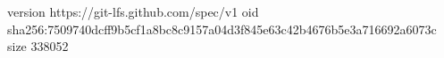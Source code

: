 version https://git-lfs.github.com/spec/v1
oid sha256:7509740dcff9b5cf1a8bc8c9157a04d3f845e63c42b4676b5e3a716692a6073c
size 338052
